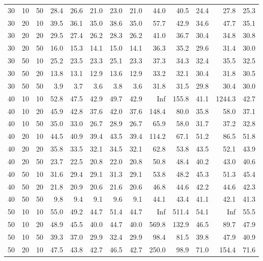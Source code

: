 \begin{table}
\begin{tabular}[t]{rrrrrrrrrrrrr}
30 & 10 & 50 & 28.4 & 26.6 & 21.0 & 23.0 & 21.0 & 44.0 & 40.5 & 24.4 & 27.8 & 25.3\\
30 & 20 & 10 & 39.5 & 36.1 & 35.0 & 38.6 & 35.0 & 57.7 & 42.9 & 34.6 & 47.7 & 35.1\\
30 & 20 & 20 & 29.5 & 27.4 & 26.2 & 28.3 & 26.2 & 41.0 & 36.7 & 30.4 & 34.8 & 30.8\\
30 & 20 & 50 & 16.0 & 15.3 & 14.1 & 15.0 & 14.1 & 36.3 & 35.2 & 29.6 & 31.4 & 30.0\\
30 & 50 & 10 & 25.2 & 23.5 & 23.3 & 25.1 & 23.3 & 37.3 & 34.3 & 32.4 & 35.5 & 32.5\\

30 & 50 & 20 & 13.8 & 13.1 & 12.9 & 13.6 & 12.9 & 33.2 & 32.1 & 30.4 & 31.8 & 30.5\\
30 & 50 & 50 & 3.9 & 3.7 & 3.6 & 3.8 & 3.6 & 31.8 & 31.5 & 29.8 & 30.4 & 30.0\\
40 & 10 & 10 & 52.8 & 47.5 & 42.9 & 49.7 & 42.9 & Inf & 155.8 & 41.1 & 1244.3 & 42.7\\
40 & 10 & 20 & 45.9 & 42.8 & 37.6 & 42.0 & 37.6 & 148.4 & 80.0 & 35.8 & 58.0 & 37.1\\
40 & 10 & 50 & 35.0 & 33.0 & 26.7 & 28.9 & 26.7 & 65.9 & 58.0 & 31.7 & 37.2 & 32.8\\

40 & 20 & 10 & 44.5 & 40.9 & 39.4 & 43.5 & 39.4 & 114.2 & 67.1 & 51.2 & 86.5 & 51.8\\
40 & 20 & 20 & 35.8 & 33.5 & 32.1 & 34.5 & 32.1 & 62.8 & 53.8 & 43.5 & 52.1 & 43.9\\
40 & 20 & 50 & 23.7 & 22.5 & 20.8 & 22.0 & 20.8 & 50.8 & 48.4 & 40.2 & 43.0 & 40.6\\
40 & 50 & 10 & 31.6 & 29.4 & 29.1 & 31.3 & 29.1 & 53.8 & 48.2 & 45.3 & 51.3 & 45.4\\
40 & 50 & 20 & 21.8 & 20.9 & 20.6 & 21.6 & 20.6 & 46.8 & 44.6 & 42.2 & 44.6 & 42.3\\

40 & 50 & 50 & 9.8 & 9.4 & 9.1 & 9.6 & 9.1 & 44.1 & 43.4 & 41.1 & 42.1 & 41.3\\
50 & 10 & 10 & 55.0 & 49.2 & 44.7 & 51.4 & 44.7 & Inf & 511.4 & 54.1 & Inf & 55.5\\
50 & 10 & 20 & 48.9 & 45.5 & 40.0 & 44.7 & 40.0 & 569.8 & 132.9 & 46.5 & 89.7 & 47.9\\
50 & 10 & 50 & 39.3 & 37.0 & 29.9 & 32.4 & 29.9 & 98.4 & 81.5 & 39.8 & 47.9 & 40.9\\
50 & 20 & 10 & 47.5 & 43.8 & 42.7 & 46.5 & 42.7 & 250.0 & 98.9 & 71.0 & 154.4 & 71.6\\


\end{tabular}
\end{table}
